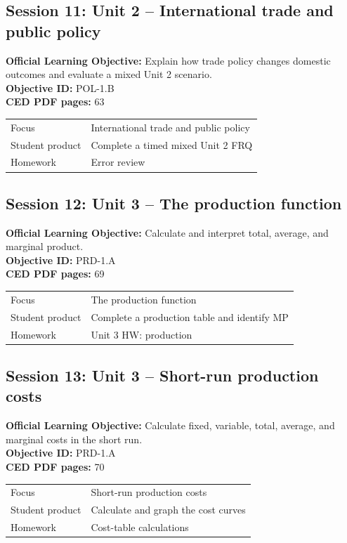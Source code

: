 \documentclass[11pt,a4paper]{article}
\newcommand{\objectivebox}[1]{\noindent\colorbox{aplight}{\parbox{0.96\textwidth}{#1}}}
\begin{document}
\subsection{Session 11: Unit 2 -- International trade and public policy}
\objectivebox{\textbf{Official Learning Objective:} Explain how trade policy changes domestic outcomes and evaluate a mixed Unit 2 scenario.\\\textbf{Objective ID:} POL-1.B\\\textbf{CED PDF pages:} 63}\par\vspace{0.4em}
\begin{tabularx}{\textwidth}{p{3.0cm}Y}
\toprule
Focus & International trade and public policy\\
Student product & Complete a timed mixed Unit 2 FRQ\\
Homework & Error review\\
\bottomrule
\end{tabularx}
\subsection{Session 12: Unit 3 -- The production function}
\objectivebox{\textbf{Official Learning Objective:} Calculate and interpret total, average, and marginal product.\\\textbf{Objective ID:} PRD-1.A\\\textbf{CED PDF pages:} 69}\par\vspace{0.4em}
\begin{tabularx}{\textwidth}{p{3.0cm}Y}
\toprule
Focus & The production function\\
Student product & Complete a production table and identify MP\\
Homework & Unit 3 HW: production\\
\bottomrule
\end{tabularx}
\newpage
\subsection{Session 13: Unit 3 -- Short-run production costs}
\objectivebox{\textbf{Official Learning Objective:} Calculate fixed, variable, total, average, and marginal costs in the short run.\\\textbf{Objective ID:} PRD-1.A\\\textbf{CED PDF pages:} 70}\par\vspace{0.4em}
\begin{tabularx}{\textwidth}{p{3.0cm}Y}
\toprule
Focus & Short-run production costs\\
Student product & Calculate and graph the cost curves\\
Homework & Cost-table calculations\\
\bottomrule
\end{tabularx}
\end{document}
